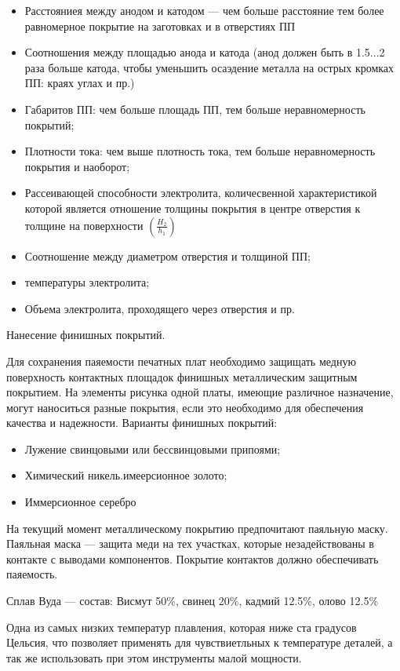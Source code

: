 \documentclass{article}
\begin{document}
\begin{itemize}
	\item Расстояниея между анодом и катодом --- чем больше расстояние тем более равномерное покрытие на заготовках и в отверстиях ПП
	\item Соотношения между площадью анода и катода (анод должен быть в 1.5...2 раза больше катода, чтобы уменьшить осаэдение металла на острых кромках ПП: краях углах и пр.)
	\item Габаритов ПП: чем больше площадь ПП, тем больше неравномерность покрытий;
	\item Плотности тока: чем выше плотность тока, тем больше неравномерность покрытия и наоборот;
	\item Рассеивающей способности электролита, количесвенной характеристикой которой является отношение толщины покрытия в центре отверстия к толщине на поверхности $\left( \frac{H_2}{h_1} \right)$
	\item Соотношение между диаметром отверстия и толщиной ПП;
	\item температуры электролита;
	\item Объема электролита, проходящего через отверстия и пр.
\end{itemize}

Нанесение финишных покрытий.

Для сохранения паяемости печатных плат необходимо защищать медную поверхность контактных площадок финишных металлическим защитным покрытием. На элементы рисунка одной платы, имеющие различное назначение, могут наноситься разные покрытия, если это необходимо для обеспечения качества и надежности. Варианты финишных покрытий:
\begin{itemize}
	\item Лужение свинцовыми или бессвинцовыми припоями;
	\item Химический никель.имеерсионное золото;
	\item Иммерсионное серебро
\end{itemize}

На текущий момент металлическому покрытию предпочитают паяльную маску. Паяльная маска --- защита меди на тех участках, которые незадействованы в контакте с выводами компонентов. Покрытие контактов должно обеспечивать паяемость.

Сплав Вуда --- состав: Висмут 50\%, свинец 20\%, кадмий 12.5\%, олово 12.5\%

Одна из самых низких температур плавления, которая ниже ста градусов Цельсия, что позволяет применять для чувствиетльных к температуре деталей, а так же использовать при этом инструменты малой мощности.
\end{document}
